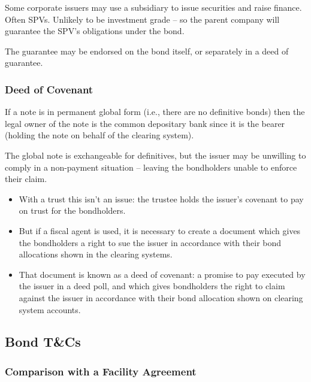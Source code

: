 \documentclass[
]{article}
\providecommand{\tightlist}{%
  \setlength{\itemsep}{0pt}\setlength{\parskip}{0pt}}
\begin{document}
Some corporate issuers may use a subsidiary to issue securities and
raise finance. Often SPVs. Unlikely to be investment grade -- so the
parent company will guarantee the SPV's obligations under the bond.

The guarantee may be endorsed on the bond itself, or separately in a
deed of guarantee.

\hypertarget{deed-of-covenant}{%
\subsubsection{Deed of Covenant}\label{deed-of-covenant}}

If a note is in permanent global form (i.e., there are no definitive
bonds) then the legal owner of the note is the common depositary bank
since it is the bearer (holding the note on behalf of the clearing
system).

The global note is exchangeable for definitives, but the issuer may be
unwilling to comply in a non-payment situation -- leaving the
bondholders unable to enforce their claim.

\begin{itemize}
\tightlist
\item
  With a trust this isn't an issue: the trustee holds the issuer's
  covenant to pay on trust for the bondholders.
\item
  But if a fiscal agent is used, it is necessary to create a document
  which gives the bondholders a right to sue the issuer in accordance
  with their bond allocations shown in the clearing systems.
\item
  That document is known as a deed of covenant: a promise to pay
  executed by the issuer in a deed poll, and which gives bondholders the
  right to claim against the issuer in accordance with their bond
  allocation shown on clearing system accounts.
\end{itemize}

\hypertarget{bond-tcs}{%
\subsection{Bond T\&Cs}\label{bond-tcs}}

\hypertarget{comparison-with-a-facility-agreement}{%
\subsubsection{Comparison with a Facility
Agreement}\label{comparison-with-a-facility-agreement}}
\end{document}
